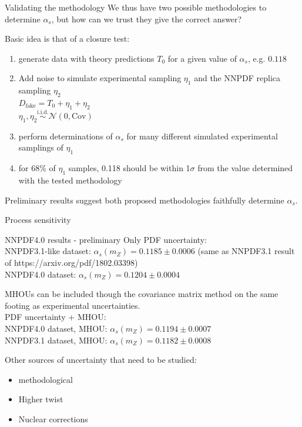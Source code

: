\documentclass[8pt,t]{beamer}
\begin{document}
\begin{frame}{Validating the methodology}
  We thus have two possible methodologies to determine $\alpha_s$, but how can we trust they give the correct answer?

  \vspace*{1em}
  Basic idea is that of a closure test:
  \begin{enumerate}
    \item generate data with theory predictions $T_0$ for a given value of $\alpha_s$, e.g. $0.118$
    \item Add noise to simulate experimental sampling $\eta_1$ and the NNPDF replica sampling $\eta_2$ \\
    $D_\mathrm{fake} = T_0 + \eta_1 + \eta_2$ \\
    $\eta_1, \eta_2  \overset{\text{i.i.d.}}{\sim} \mathcal{N}(0,\mathrm{Cov})$
    \item perform determinations of $\alpha_s$ for many different simulated experimental samplings of $\eta_1$
    \item for 68\% of $\eta_1$ samples, 0.118 should be within 1$\sigma$ from the value determined with the tested methodology
  \end{enumerate}

  \vspace*{1em}
  Preliminary results suggest both proposed methodologies faithfully determine $\alpha_s$.
\end{frame}


\begin{frame}{Process sensitivity}
\end{frame}


\begin{frame}{NNPDF4.0 results - preliminary}
  Only PDF uncertainty: \\
  NNPDF3.1-like dataset: $\alpha_s(m_Z) = 0.1185 \pm 0.0006$ (same as NNPDF3.1 result of https://arxiv.org/pdf/1802.03398)\\
  NNPDF4.0 dataset: $\alpha_s(m_Z) = 0.1204 ± 0.0004$

  \vspace*{1em}
  MHOUs can be included though the covariance matrix method on the same footing as experimental uncertainties.\\
  PDF uncertainty + MHOU: \\
  NNPDF4.0 dataset, MHOU: $\alpha_s(m_Z)=0.1194 \pm 0.0007$ \\
  NNPDF3.1 dataset, MHOU: $\alpha_s(m_Z) = 0.1182 \pm 0.0008$

  \vspace*{1em}
  Other sources of uncertainty that need to be studied:
  \begin{itemize}
    \item methodological
    \item Higher twist
    \item Nuclear corrections
  \end{itemize}

\end{frame}
\end{document}
